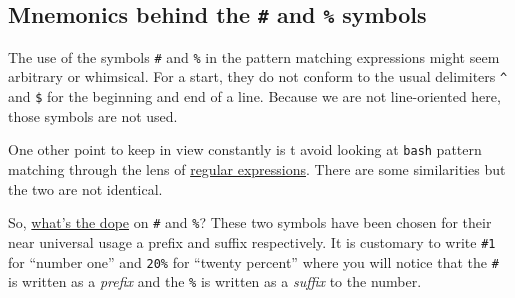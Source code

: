 \documentclass[
  a4paper,
]{article}
\newenvironment{Shaded}{\begin{snugshade}}{\end{snugshade}}
\newcommand{\BuiltInTok}[1]{\textcolor[rgb]{0.80,0.80,0.80}{#1}}
\newcommand{\CommentTok}[1]{\textcolor[rgb]{0.50,0.62,0.50}{#1}}
\newcommand{\NormalTok}[1]{\textcolor[rgb]{0.80,0.80,0.80}{#1}}
\newcommand{\OperatorTok}[1]{\textcolor[rgb]{0.94,0.94,0.82}{#1}}
\newcommand{\PreprocessorTok}[1]{\textcolor[rgb]{1.00,0.81,0.69}{\textbf{#1}}}
\newcommand{\StringTok}[1]{\textcolor[rgb]{0.80,0.58,0.58}{#1}}
\newcommand{\VariableTok}[1]{\textcolor[rgb]{0.80,0.80,0.80}{#1}}
\begin{document}
\begin{Shaded}
\end{Shaded}

\hypertarget{mnemonics-behind-the-and-symbols}{%
\subsection{\texorpdfstring{Mnemonics behind the \texttt{\#} and
\texttt{\%}
symbols}{Mnemonics behind the \# and \% symbols}}\label{mnemonics-behind-the-and-symbols}}

The use of the symbols \texttt{\#} and \texttt{\%} in the pattern
matching expressions might seem arbitrary or whimsical. For a start,
they do not conform to the usual delimiters \texttt{\^{}} and
\texttt{\$} for the beginning and end of a line. Because we are not
line-oriented here, those symbols are not used.

One other point to keep in view constantly is t avoid looking at
\texttt{bash} pattern matching through the lens of
\href{https://www.regular-expressions.info/tutorial.html}{regular
expressions}. There are some similarities but the two are not identical.

So,
\href{https://www.ldoceonline.com/dictionary/the-dope-on-somebody-something}{what's
the dope} on \texttt{\#} and \texttt{\%}? These two symbols have been
chosen for their near universal usage a prefix and suffix respectively.
It is customary to write \texttt{\#1} for ``number one'' and
\texttt{20\%} for ``twenty percent'' where you will notice that the
\texttt{\#} is written as a \emph{prefix} and the \texttt{\%} is written
as a \emph{suffix} to the number.
\end{document}
